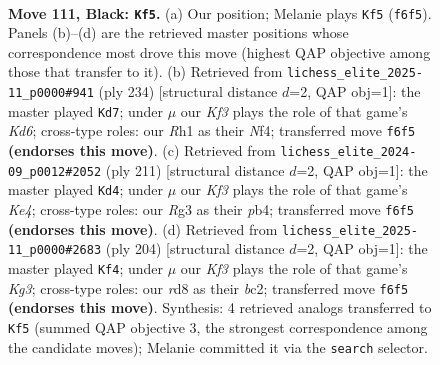 \documentclass[11pt]{article}
\begin{document}
\clearpage

\begin{figure}[p]\centering
\begin{subfigure}{0.46\textwidth}\centering
\resizebox{\linewidth}{!}{%
\newchessgame
\chessboard[
  setfen={3R4/8/5k2/8/8/6r1/4K3/7r b - - 33 111},
  showmover=false,
  pgfstyle=straightmove, color=movearrow, markmove={f6-f5}
]}
\caption{}
\end{subfigure}\hfill
\begin{subfigure}{0.46\textwidth}\centering
\resizebox{\linewidth}{!}{%
\newchessgame
\chessboard[
  setfen={8/8/3K4/8/5N2/1r6/7R/2k5 w - - 77 118},
  showmover=false,
  pgfstyle=straightmove, color=movearrow, markmove={d6-d7}
]}
\caption{}
\end{subfigure}
\\[4pt]
\begin{subfigure}{0.46\textwidth}\centering
\resizebox{\linewidth}{!}{%
\newchessgame
\chessboard[
  setfen={7R/8/8/4k3/1P6/8/5r2/1K6 b - - 2 106},
  showmover=false,
  pgfstyle=straightmove, color=movearrow, markmove={e5-d4}
]}
\caption{}
\end{subfigure}\hfill
\begin{subfigure}{0.46\textwidth}\centering
\resizebox{\linewidth}{!}{%
\newchessgame
\chessboard[
  setfen={1R6/8/7r/8/8/6K1/k1b5/8 w - - 16 103},
  showmover=false,
  pgfstyle=straightmove, color=movearrow, markmove={g3-f4}
]}
\caption{}
\end{subfigure}
\caption{\textbf{Move 111, Black: \texttt{Kf5}.} (a) Our position; Melanie plays \texttt{Kf5} (\texttt{f6f5}). Panels (b)--(d) are the retrieved master positions whose correspondence most drove this move (highest QAP objective among those that transfer to it). (b) Retrieved from \texttt{lichess\_elite\_2025-11\_p0000\#941} (ply 234) [structural distance $d$=2, QAP obj=1]: the master played \texttt{Kd7}; under $\mu$ our \emph{Kf3} plays the role of that game's \emph{Kd6}; cross-type roles: our \emph{R}h1 as their \emph{N}f4; transferred move \texttt{f6f5} \textbf{(endorses this move)}. (c) Retrieved from \texttt{lichess\_elite\_2024-09\_p0012\#2052} (ply 211) [structural distance $d$=2, QAP obj=1]: the master played \texttt{Kd4}; under $\mu$ our \emph{Kf3} plays the role of that game's \emph{Ke4}; cross-type roles: our \emph{R}g3 as their \emph{p}b4; transferred move \texttt{f6f5} \textbf{(endorses this move)}. (d) Retrieved from \texttt{lichess\_elite\_2025-11\_p0000\#2683} (ply 204) [structural distance $d$=2, QAP obj=1]: the master played \texttt{Kf4}; under $\mu$ our \emph{Kf3} plays the role of that game's \emph{Kg3}; cross-type roles: our \emph{r}d8 as their \emph{b}c2; transferred move \texttt{f6f5} \textbf{(endorses this move)}. Synthesis: 4 retrieved analogs transferred to \texttt{Kf5} (summed QAP objective 3, the strongest correspondence among the candidate moves); Melanie committed it via the \texttt{search} selector.}
\label{fig:thought-m221}
\end{figure}
\end{document}
